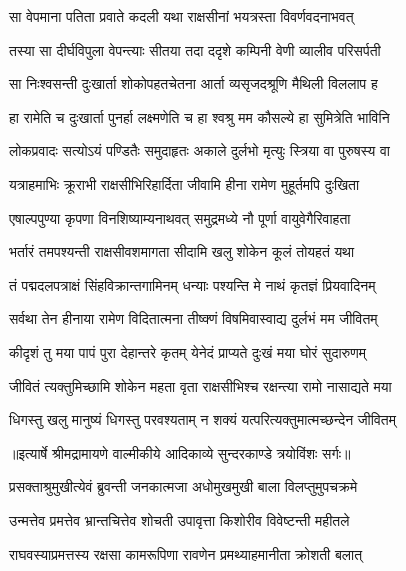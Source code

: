 \twolineshloka
{सा वेपमाना पतिता प्रवाते कदली यथा}
{राक्षसीनां भयत्रस्ता विवर्णवदनाभवत्} %

\twolineshloka
{तस्या सा दीर्घविपुला वेपन्त्याः सीतया तदा}
{ददृशे कम्पिनी वेणी व्यालीव परिसर्पती} %

\twolineshloka
{सा निःश्वसन्ती दुःखार्ता शोकोपहतचेतना}
{आर्ता व्यसृजदश्रूणि मैथिली विललाप ह} %

\twolineshloka
{हा रामेति च दुःखार्ता पुनर्हा लक्ष्मणेति च}
{हा श्वश्रु मम कौसल्ये हा सुमित्रेति भाविनि} %

\twolineshloka
{लोकप्रवादः सत्योऽयं पण्डितैः समुदाहृतः}
{अकाले दुर्लभो मृत्युः स्त्रिया वा पुरुषस्य वा} %

\twolineshloka
{यत्राहमाभिः क्रूराभी राक्षसीभिरिहार्दिता}
{जीवामि हीना रामेण मुहूर्तमपि दुःखिता} %

\twolineshloka
{एषाल्पपुण्या कृपणा विनशिष्याम्यनाथवत्}
{समुद्रमध्ये नौ पूर्णा वायुवेगैरिवाहता} %

\twolineshloka
{भर्तारं तमपश्यन्ती राक्षसीवशमागता}
{सीदामि खलु शोकेन कूलं तोयहतं यथा} %

\twolineshloka
{तं पद्मदलपत्राक्षं सिंहविक्रान्तगामिनम्}
{धन्याः पश्यन्ति मे नाथं कृतज्ञं प्रियवादिनम्} %

\twolineshloka
{सर्वथा तेन हीनाया रामेण विदितात्मना}
{तीष्क्णं विषमिवास्वाद्य दुर्लभं मम जीवितम्} %

\twolineshloka
{कीदृशं तु मया पापं पुरा देहान्तरे कृतम्}
{येनेदं प्राप्यते दुःखं मया घोरं सुदारुणम्} %

\twolineshloka
{जीवितं त्यक्तुमिच्छामि शोकेन महता वृता}
{राक्षसीभिश्च रक्षन्त्या रामो नासाद्यते मया} %

\twolineshloka
{धिगस्तु खलु मानुष्यं धिगस्तु परवश्यताम्}
{न शक्यं यत्परित्यक्तुमात्मच्छन्देन जीवितम्} %


{॥इत्यार्षे श्रीमद्रामायणे वाल्मीकीये आदिकाव्ये सुन्दरकाण्डे त्रयोविंशः सर्गः॥}


\twolineshloka
{प्रसक्ताश्रुमुखीत्येवं ब्रुवन्ती जनकात्मजा}
{अधोमुखमुखी बाला विलप्तुमुपचक्रमे} %

\twolineshloka
{उन्मत्तेव प्रमत्तेव भ्रान्तचित्तेव शोचती}
{उपावृत्ता किशोरीव विवेष्टन्ती महीतले} %

\twolineshloka
{राघवस्याप्रमत्तस्य रक्षसा कामरूपिणा}
{रावणेन प्रमथ्याहमानीता क्रोशती बलात्} %

